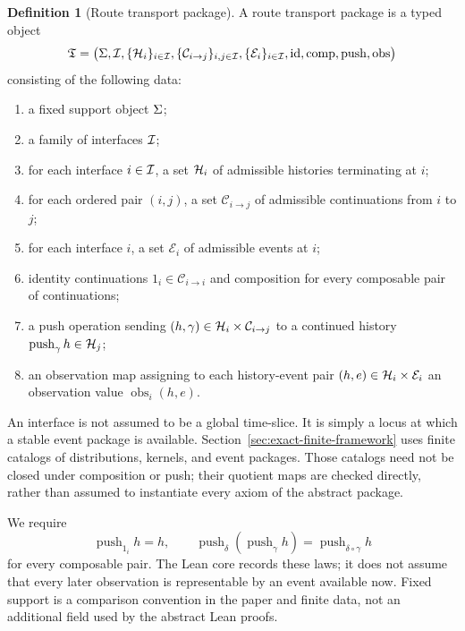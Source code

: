 \documentclass[11pt]{article}
\theoremstyle{definition}
\newtheorem{definition}[theorem]{Definition}
\begin{document}
\begin{definition}[Route transport package]\label{def:route-transport-package}
A route transport package is a typed object
\[
\mathfrak{T}=
\bigl(
\Sigma,\mathcal{I},\{\mathcal{H}_i\}_{i\in\mathcal{I}},
\{\mathcal{C}_{i\to j}\}_{i,j\in\mathcal{I}},
\{\mathcal{E}_i\}_{i\in\mathcal{I}},
\operatorname{id},\operatorname{comp},\operatorname{push},\operatorname{obs}
\bigr)
\]
consisting of the following data:
\begin{enumerate}
\item a fixed support object $\Sigma$;
\item a family of interfaces $\mathcal{I}$;
\item for each interface $i\in\mathcal{I}$, a set $\mathcal{H}_i$ of admissible histories terminating at $i$;
\item for each ordered pair $(i,j)$, a set $\mathcal{C}_{i\to j}$ of admissible continuations from $i$ to $j$;
\item for each interface $i$, a set $\mathcal{E}_i$ of admissible events at $i$;
\item identity continuations $1_i\in\mathcal{C}_{i\to i}$ and composition for every composable pair of continuations;
\item a push operation sending $(h,\gamma)\in \mathcal{H}_i\times \mathcal{C}_{i\to j}$ to a continued history $\operatorname{push}_{\gamma} h\in\mathcal{H}_j$;
\item an observation map assigning to each history-event pair $(h,e)\in\mathcal{H}_i\times\mathcal{E}_i$ an observation value $\operatorname{obs}_i(h,e)$.
\end{enumerate}
\end{definition}

An interface is not assumed to be a global time-slice. It is simply a locus at which a stable event package is available. Section~\ref{sec:exact-finite-framework} uses finite catalogs of distributions, kernels, and event packages. Those catalogs need not be closed under composition or push; their quotient maps are checked directly, rather than assumed to instantiate every axiom of the abstract package.

We require
\[
\operatorname{push}_{1_i}h=h,\qquad
\operatorname{push}_{\delta}(\operatorname{push}_{\gamma}h)
=\operatorname{push}_{\delta\circ\gamma}h
\]
for every composable pair. The Lean core records these laws; it does not assume that every later observation is representable by an event available now. Fixed support is a comparison convention in the paper and finite data, not an additional field used by the abstract Lean proofs.
\end{document}
